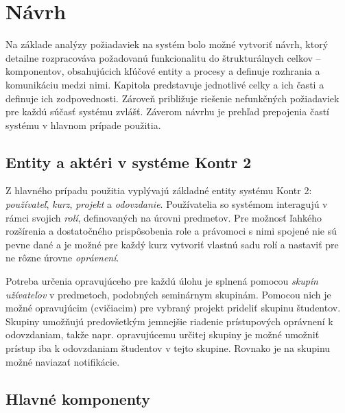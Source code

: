 \documentclass[
  digital, %
  twoside, %
  table,   %
  lof,     %
  lot,     %
]{fithesis3}
\begin{document}
\chapter{Návrh}
Na základe analýzy požiadaviek na systém bolo možné vytvoriť návrh, ktorý detailne rozpracováva požadovanú funkcionalitu do štrukturálnych celkov -- komponentov, obsahujúcich kľúčové entity a procesy a definuje rozhrania a komunikáciu medzi nimi. Kapitola predstavuje jednotlivé celky a ich časti a definuje ich zodpovednosti. Zároveň približuje riešenie nefunkčných požiadaviek pre každú súčasť systému zvlášť. Záverom návrhu je prehľad prepojenia častí systému v hlavnom prípade použitia. 


\section{Entity a aktéri v systéme Kontr 2}

Z hlavného prípadu použitia vyplývajú základné entity systému Kontr 2: \emph{používateľ}, \emph{kurz}, \emph{projekt} a \emph{odovzdanie}. Používatelia so systémom interagujú v rámci svojich \emph{rolí}, definovaných na úrovni predmetov. Pre možnosť ľahkého rozšírenia a dostatočného prispôsobenia role a právomoci s nimi spojené nie sú pevne dané a je možné pre každý kurz vytvoriť vlastnú sadu rolí a nastaviť pre ne rôzne úrovne \emph{oprávnení}.

Potreba určenia opravujúceho pre každú úlohu je splnená pomocou \emph{skupín užívateľov} v predmetoch, podobných seminárnym skupinám. Pomocou nich je možné opravujúcim (cvičiacim) pre vybraný projekt prideliť skupinu študentov. Skupiny umožňujú predovšetkým jemnejšie riadenie prístupových oprávnení k odovzdaniam, takže napr. opravujúcemu určitej skupiny je možné umožniť prístup iba k odovzdaniam študentov v tejto skupine. Rovnako je na skupinu možné naviazať notifikácie.


\section{Hlavné komponenty}
\end{document}
